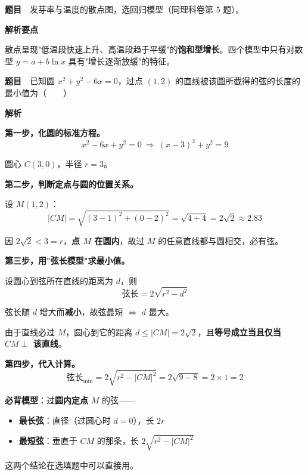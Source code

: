 \par\medskip


\textbf{题目}　发芽率与温度的散点图，选回归模型（同理科卷第 5 题）。

\begin{center}\end{center}

\textbf{解析要点}

散点呈现"低温段快速上升、高温段趋于平缓"的\textbf{饱和型增长}。四个模型中只有对数型 $y=a+b\ln x$ 具有"增长逐渐放缓"的特征。


\par\medskip


\textbf{题目}　已知圆 $x^{2}+y^{2}-6x=0$，过点 $(1,2)$ 的直线被该圆所截得的弦的长度的最小值为（　　）

\textbf{解析}

\textbf{第一步，化圆的标准方程。}
\[x^{2}-6x+y^{2}=0\ \Longrightarrow\ (x-3)^{2}+y^{2}=9\]

圆心 $C(3,0)$，半径 $r=3$。

\textbf{第二步，判断定点与圆的位置关系。}

设 $M(1,2)$：
\[|CM|=\sqrt{(3-1)^{2}+(0-2)^{2}}=\sqrt{4+4}=2\sqrt2\approx2.83\]

因 $2\sqrt2<3=r$，\textbf{点 $M$ 在圆内}，故过 $M$ 的任意直线都与圆相交，必有弦。

\textbf{第三步，用"弦长模型"求最小值。}

设圆心到弦所在直线的距离为 $d$，则
\[\text{弦长}=2\sqrt{r^{2}-d^{2}}\]

弦长随 $d$ 增大而\textbf{减小}，故弦最短 $\iff$ $d$ 最大。

由于直线必过 $M$，圆心到它的距离 $d\le|CM|=2\sqrt2$，且\textbf{等号成立当且仅当 $CM\perp$ 该直线}。

\textbf{第四步，代入计算。}
\[\text{弦长}_{\min}=2\sqrt{r^{2}-|CM|^{2}}=2\sqrt{9-8}=2\times1=2\]


\begin{gktip}
\textbf{必背模型}：过\textbf{圆内定点} $M$ 的弦——
\begin{itemize}
\item \textbf{最长弦}：直径（过圆心时 $d=0$），长 $2r$
\item \textbf{最短弦}：垂直于 $CM$ 的那条，长 $2\sqrt{r^{2}-|CM|^{2}}$
\end{itemize}

这两个结论在选填题中可以直接用。
\end{gktip}


